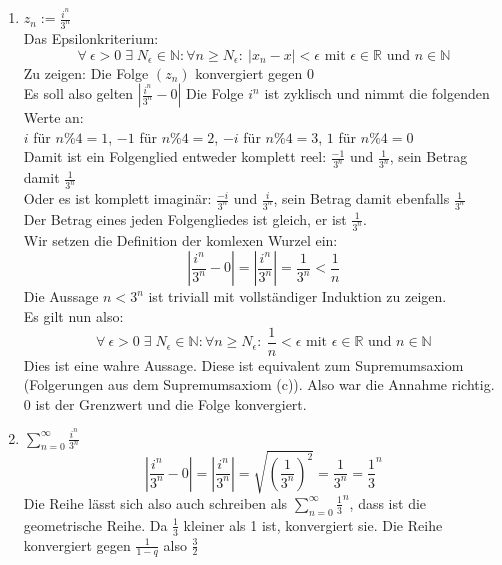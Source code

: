 \documentclass{article}
\begin{document}
\begin{enumerate}[ label = (\alph*) ]
\begin{enumerate}[ label = (\roman*) ]
            \item \(z_n := \frac{i^n}{3^n}\) \\
            Das Epsilonkriterium:
            \[\forall \: \epsilon > 0 \; \exists \; N_{\epsilon} \in \mathbb{N} : \forall n \geq N_{\epsilon}: \: |x_n - x| < \epsilon
                \text{ mit } \epsilon \in \mathbb{R} \text{ und } n \in \mathbb{N}\]
            Zu zeigen: Die Folge \((z_n)\) konvergiert gegen 0 \\
            Es soll also gelten \(|\frac{i^n}{3^n} -0|\)
            Die Folge \(i^n\) ist zyklisch und nimmt die folgenden Werte an: \\
            \(i\) für \(n \% 4 = 1\),  \(-1\) für \(n \% 4 = 2\), \(-i\) für \(n \% 4 = 3\), \(1\) für \(n \% 4 = 0\) \\
            Damit ist ein Folgenglied entweder komplett reel: \(\frac{-1}{3^n}\) und \(\frac{1}{3^n}\), sein Betrag damit \(\frac{1}{3^n}\) \\
            Oder es ist komplett imaginär: \(\frac{-i}{3^n}\) und \(\frac{i}{3^n}\), sein Betrag damit ebenfalls \(\frac{1}{3^n}\) \\
            Der Betrag eines jeden Folgengliedes ist gleich, er ist \(\frac{1}{3^n}\). \\
            Wir setzen die Definition der komlexen Wurzel ein:
            \[ |\frac{i^n}{3^n} -0| = |\frac{i^n}{3^n}| = \frac{1}{3^n} < \frac{1}{n}\]
            Die Aussage \(n < 3^n\) ist triviall mit vollständiger Induktion zu zeigen. \\
            Es gilt nun also: \\
            \[\forall \: \epsilon > 0 \; \exists \; N_{\epsilon} \in \mathbb{N} : \forall n \geq N_{\epsilon}: \: \frac{1}{n} < \epsilon
                \text{ mit } \epsilon \in \mathbb{R} \text{ und } n \in \mathbb{N}\]
            Dies ist eine wahre Aussage. Diese ist equivalent zum Supremumsaxiom (Folgerungen aus dem Supremumsaxiom (c)).
            Also war die Annahme richtig. 0 ist der Grenzwert und die Folge konvergiert.

            \item \( \sum_{n=0}^{\infty} \frac{i^n}{3^n} \) \\
            \[ |\frac{i^n}{3^n} -0| = |\frac{i^n}{3^n}| = \sqrt{ {\left( \frac{1}{3^n} \right)}^2 } = \frac{1}{3^n} = {\frac{1}{3}}^n\]
            Die Reihe lässt sich also auch schreiben als \(\sum_{n=0}^{\infty} {\frac{1}{3}}^n \), dass ist die geometrische Reihe.
            Da \(\frac{1}{3}\) kleiner als 1 ist, konvergiert sie. Die Reihe konvergiert gegen \(\frac{1}{1-q}\) also \(\frac{3}{2}\)
            

\end{enumerate}
\end{enumerate}
\end{document}
